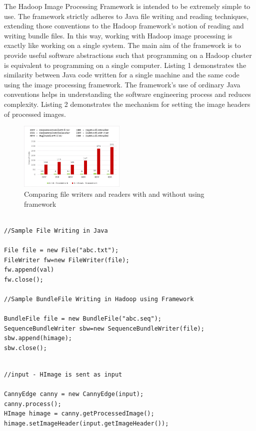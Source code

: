 \documentclass[conference]{IEEEtran}
\begin{document}
The Hadoop Image Processing Framework is intended to be extremely
simple to use. The framework strictly adheres to Java file writing and
reading techniques, extending those conventions to the Hadoop
framework's notion of reading and writing bundle files.  In this way,
working with Hadoop image processing is exactly like working on a
single system.  The main aim of the framework is to provide useful
software abstractions such that programming on a Hadoop cluster is
equivalent to programming on a single computer.  Listing 1
demonstrates the similarity between Java code written for a single
machine and the same code using the image processing framework.  The
framework's use of ordinary Java conventions helps in understanding
the software engineering process and reduces complexity.  Listing 2
demonstrates the mechanism for setting the image headers of processed
images.

\begin{figure}[h]
  \centering
  \includegraphics[width=0.45\textwidth]{files-chart2}
  \caption{Comparing file writers and readers with and without using
    framework}
  \label{fig:files-chart}
\end{figure}

\begin{lstlisting}[caption = Comparing File Writer instance in java and SequenceBundleWriter instance in Hadoop Image Processing framework ]

//Sample File Writing in Java

File file = new File("abc.txt");
FileWriter fw=new FileWriter(file);
fw.append(val)
fw.close();

//Sample BundleFile Writing in Hadoop using Framework

BundleFile file = new BundleFile("abc.seq");
SequenceBundleWriter sbw=new SequenceBundleWriter(file);
sbw.append(himage);
sbw.close();

\end{lstlisting}

\begin{lstlisting}[caption = Setting image headers for processed images using Hadoop Image Processing Framework]

//input - HImage is sent as input 

CannyEdge canny = new CannyEdge(input);
canny.process();
HImage himage = canny.getProcessedImage();
himage.setImageHeader(input.getImageHeader());

\end{lstlisting}
\end{document}
